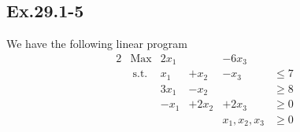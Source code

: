 \subsection*{Ex.29.1-5}

We have the following linear program
\begin{alignat}{2}
 & \text{Max} & 2x_1 & & - 6x_3 & 
\\
 & \ \text{s.t.} & x_1 & + x_2 & - x_3 & \leq 7
\\
 & & 3x_1 & - x_2 & & \geq 8
\\
 & & - x_1 & + 2x_2 & + 2x_3 & \geq 0
\\
 & & & & x_1,x_2,x_3 & \geq 0
\end{alignat}